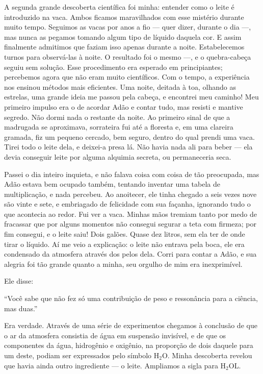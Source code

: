 A segunda grande descoberta científica foi minha: entender como o leite é
introduzido na vaca. Ambos ficamos maravilhados com esse mistério
durante muito tempo. Seguimos as vacas por anos a fio --- quer dizer, durante o dia ---,
mas nunca as pegamos tomando algum tipo de líquido daquela cor. E assim
finalmente admitimos que faziam isso apenas durante a noite. Estabelecemos turnos para
observá-las à noite. O resultado foi o mesmo ---, e o quebra-cabeça seguiu sem
solução. Esse procedimento era esperado em principiantes; percebemos
agora que não eram muito científicos. Com o tempo, a experiência nos ensinou 
métodos mais eficientes. Uma noite, deitada à toa, olhando as estrelas, uma grande
ideia me passou pela cabeça, e encontrei meu caminho! Meu primeiro impulso era o de
acordar Adão e contar tudo, mas resisti e mantive segredo. Não dormi nada
o restante da noite. Ao primeiro sinal de que a madrugada se aproximava,
sorrateira fui até a floresta e, em uma clareira gramada, fiz um pequeno
cercado, bem seguro, dentro do qual prendi uma vaca. Tirei todo o leite dela, e
deixei-a presa lá. Não havia nada ali para beber --- ela devia conseguir
leite por alguma alquimia secreta, ou permaneceria seca.

Passei o dia inteiro inquieta, e não falava coisa com coisa de tão preocupada, mas
Adão estava bem ocupado também, tentando inventar uma tabela de multiplicação,
e nada percebeu. Ao anoitecer, ele tinha chegado a seis vezes nove são vinte e sete, e
embriagado de felicidade com sua façanha, ignorando tudo o que acontecia ao redor.
Fui ver a vaca. Minhas mãos tremiam tanto por medo de fracassar
que por alguns momentos não consegui segurar a teta com firmeza; por fim consegui,
e o leite saiu! Dois galões. Quase dez litros, sem ela ter de onde tirar o
líquido. Aí me veio a explicação: o leite não entrava pela boca, ele era
condensado da atmosfera através dos pelos dela. Corri para contar a Adão, e sua
alegria foi tão grande quanto a minha, seu orgulho de mim era inexprimível.

Ele disse:

“Você sabe que não fez só uma contribuição de peso e ressonância para a
ciência, mas duas.”

Era verdade. Através de uma série de experimentos chegamos à conclusão de que o
ar da atmosfera consistia de água em suspensão invisível, e de que os componentes da
água, hidrogênio e oxigênio, na proporção de dois daquele para um deste,
podiam ser expressados pelo símbolo H$_2$O. Minha descoberta revelou
que havia ainda outro ingrediente --- o leite. Ampliamos a sigla para
H$_2$OL.

